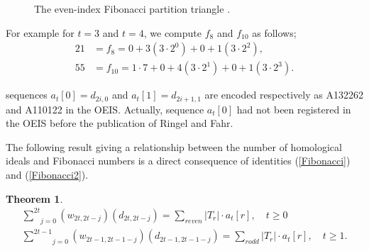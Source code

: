 \documentclass[10pt,twoside]{article}
\newtheorem{teor}{Theorem}
\theoremstyle{definition}
\begin{document}
\begin{figure}[H]
\begin{center}
\label{triangle1}
\caption{The even-index Fibonacci partition triangle \cite{Fahr3}.}
\end{center}

\end{figure}

For example for $t=3$ and $t=4$, we compute $f_{8}$ and $f_{10}$ as follows;
\begin{equation}
\begin{split}
21&=f_{8}=0+3(3\cdot 2^0)+0+1(3\cdot 2^2),\\
55&=f_{10}=1\cdot 7+0+4(3\cdot 2^1)+0+1(3\cdot 2^{3}).
\end{split}
\label{3}
\end{equation}

sequences $a_{t}[0]=d_{2i,0}$ and $a_{t}[1]=d_{2i+1,1}$ are encoded respectively as A132262 and A110122 in the OEIS. Actually, sequence $a_{t}[0]$ had not been registered in the OEIS before the publication of Ringel and Fahr.\par\bigskip

The following result giving a relationship between  the number of homological ideals and Fibonacci numbers is a direct consequence of identities (\ref{Fibonacci}) and (\ref{Fibonacci2}).

\addtocounter{teor}{4}

\begin{teor}
\begin{equation}
\begin{split}
\underset{j=0}{\overset{2t}{\sum}}(w_{2t,2t-j})(d_{2t, 2t-j})=\underset{r even}{{\sum}}|T_{r}|\cdot a_{t}[r],\quad t\geq0\\
\underset{j=0}{\overset{2t-1}{\sum}}(w_{2t-1,2t-1-j})(d_{2t-1, 2t-1-j})=\underset{r odd}{{\sum}}|T_{r}|\cdot a_{t}[r], \quad t\geq1.
\end{split}
\end{equation}

\end{teor}
\end{document}
